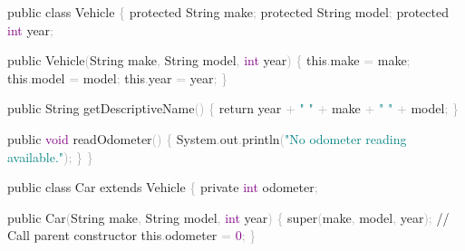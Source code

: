 \documentclass[
  justified,
  openright,
]{tufte-book}
\newcommand{\BuiltInTok}[1]{#1}
\newcommand{\CommentTok}[1]{\textcolor{MidGray}{#1}}
\newcommand{\ControlFlowTok}[1]{\textcolor{BrandBlue}{#1}}
\newcommand{\DataTypeTok}[1]{\textcolor{Purple}{#1}}
\newcommand{\DecValTok}[1]{\textcolor{Purple}{#1}}
\newcommand{\FunctionTok}[1]{\textcolor{BrandBlue}{#1}}
\newcommand{\KeywordTok}[1]{\textcolor{BrandBlue}{#1}}
\newcommand{\NormalTok}[1]{#1}
\newcommand{\OperatorTok}[1]{\textcolor{DarkGray}{#1}}
\newcommand{\StringTok}[1]{\textcolor{Teal}{#1}}
\newenvironment{Shaded}{%
  \begin{snugshade}
}{%
  \end{snugshade}
}
\begin{document}
\begin{Shaded}
\begin{Highlighting}[]
\KeywordTok{public} \KeywordTok{class}\NormalTok{ Vehicle }\OperatorTok{\{}
    \KeywordTok{protected} \BuiltInTok{String}\NormalTok{ make}\OperatorTok{;}
    \KeywordTok{protected} \BuiltInTok{String}\NormalTok{ model}\OperatorTok{;}
    \KeywordTok{protected} \DataTypeTok{int}\NormalTok{ year}\OperatorTok{;}

    \KeywordTok{public} \FunctionTok{Vehicle}\OperatorTok{(}\BuiltInTok{String}\NormalTok{ make}\OperatorTok{,} \BuiltInTok{String}\NormalTok{ model}\OperatorTok{,} \DataTypeTok{int}\NormalTok{ year}\OperatorTok{)} \OperatorTok{\{}
        \KeywordTok{this}\OperatorTok{.}\FunctionTok{make} \OperatorTok{=}\NormalTok{ make}\OperatorTok{;}
        \KeywordTok{this}\OperatorTok{.}\FunctionTok{model} \OperatorTok{=}\NormalTok{ model}\OperatorTok{;}
        \KeywordTok{this}\OperatorTok{.}\FunctionTok{year} \OperatorTok{=}\NormalTok{ year}\OperatorTok{;}
    \OperatorTok{\}}

    \KeywordTok{public} \BuiltInTok{String} \FunctionTok{getDescriptiveName}\OperatorTok{()} \OperatorTok{\{}
        \ControlFlowTok{return}\NormalTok{ year }\OperatorTok{+} \StringTok{" "} \OperatorTok{+}\NormalTok{ make }\OperatorTok{+} \StringTok{" "} \OperatorTok{+}\NormalTok{ model}\OperatorTok{;}
    \OperatorTok{\}}

    \KeywordTok{public} \DataTypeTok{void} \FunctionTok{readOdometer}\OperatorTok{()} \OperatorTok{\{}
        \BuiltInTok{System}\OperatorTok{.}\FunctionTok{out}\OperatorTok{.}\FunctionTok{println}\OperatorTok{(}\StringTok{"No odometer reading available."}\OperatorTok{);}
    \OperatorTok{\}}
\OperatorTok{\}}

\KeywordTok{public} \KeywordTok{class}\NormalTok{ Car }\KeywordTok{extends}\NormalTok{ Vehicle }\OperatorTok{\{}
    \KeywordTok{private} \DataTypeTok{int}\NormalTok{ odometer}\OperatorTok{;}

    \KeywordTok{public} \FunctionTok{Car}\OperatorTok{(}\BuiltInTok{String}\NormalTok{ make}\OperatorTok{,} \BuiltInTok{String}\NormalTok{ model}\OperatorTok{,} \DataTypeTok{int}\NormalTok{ year}\OperatorTok{)} \OperatorTok{\{}
        \KeywordTok{super}\OperatorTok{(}\NormalTok{make}\OperatorTok{,}\NormalTok{ model}\OperatorTok{,}\NormalTok{ year}\OperatorTok{);}   \CommentTok{// Call parent constructor}
        \KeywordTok{this}\OperatorTok{.}\FunctionTok{odometer} \OperatorTok{=} \DecValTok{0}\OperatorTok{;}
    \OperatorTok{\}}


\end{Highlighting}
\end{Shaded}
\end{document}
